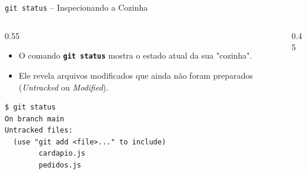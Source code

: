 \documentclass[aspectratio=169]{beamer}
\begin{document}
\begin{frame}[fragile]{\texttt{git status} -- Inspecionando a Cozinha}
    \begin{columns}
        \begin{column}{0.55\textwidth}
            \begin{itemize}
                \item O comando \textbf{\texttt{git status}} mostra o estado atual da sua "cozinha".
                \item Ele revela arquivos modificados que ainda não foram preparados (\textit{Untracked} ou \textit{Modified}).
            \end{itemize}
\begin{lstlisting}[basicstyle=\ttfamily\tiny]
$ git status
On branch main
Untracked files:
  (use "git add <file>..." to include)
        cardapio.js
        pedidos.js
\end{lstlisting}
        \end{column}
        \begin{column}{0.45\textwidth}
            \begin{center}
            \end{center}
        \end{column}
    \end{columns}
\end{frame}
\end{document}
